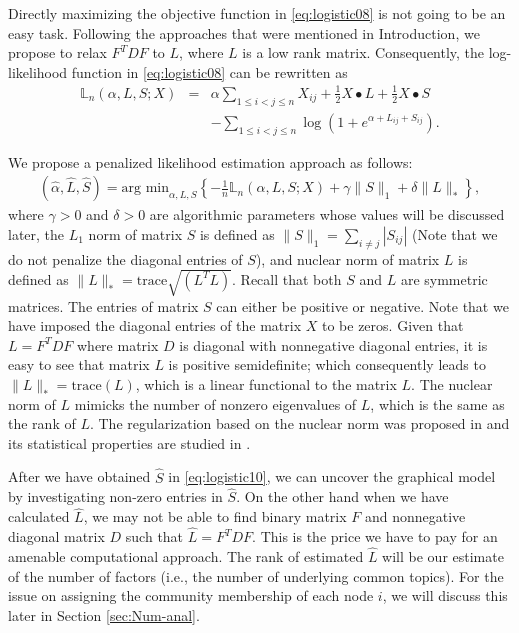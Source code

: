 \documentclass[AMS,STIX1COL]{WileyNJD-v2}
\begin{document}
{\begin{enumerate}
\end{enumerate}


Directly maximizing the objective function in \eqref{eq:logistic08} is not going to be an easy task.
Following the approaches that were mentioned in Introduction, we propose to relax $F^T D F$ to $L$, where $L$ is a low rank matrix.
Consequently, the log-likelihood function in \eqref{eq:logistic08} can be rewritten as
\begin{eqnarray}
\label{eq:logistic09}
\mathbb{L}_n(\alpha,  L, S; X)
&=& \alpha \sum_{1\le i< j\le n}X_{ij} +\frac{1}{2} X \bullet L +\frac{1}{2} X \bullet S \\
&& -\sum_{1\le i<j\le n} \log \left(1 + e^{\alpha + L_{ij} +S_{ij}}\right). \nonumber
\end{eqnarray}


We propose a penalized likelihood estimation approach as follows:
\begin{eqnarray}
\label{eq:logistic10}
(\hat{\alpha}, \widehat{L}, \widehat{S})
= \mbox{arg min}_{\alpha, L, S} \left\{
-\frac{1}{n} \mathbb{L}_n(\alpha,  L, S; X) + \gamma \|S\|_1
+ \delta \|L\|_\ast\right\},
\end{eqnarray}
where $\gamma>0$ and $\delta>0$ are algorithmic parameters whose values will be discussed later,
the $L_1$ norm of matrix $S$ is defined as $\|S\|_1 = \sum_{i\neq j} |S_{ij}|$ (Note that we do not penalize the diagonal entries of $S$), and nuclear norm of matrix $L$ is defined as $\|L\|_\ast = {\mbox{trace}\sqrt{(L^T L)}}$.
Recall that both $S$ and $L$ are symmetric matrices.
The entries of matrix $S$ can either be positive or negative.
Note that we have imposed the diagonal entries of the matrix $X$ to be zeros.
Given that $L = F^T D F$ where matrix $D$ is diagonal with nonnegative diagonal entries, it is easy to see that matrix $L$ is positive semidefinite; which consequently leads to $\|L\|_\ast = \mbox{trace}(L)$, which is a linear functional to the matrix $L$.
The nuclear norm of $L$ mimicks the number of nonzero eigenvalues of $L$, which is the same as the rank
of $L$.
The regularization based on the nuclear norm was proposed in \cite{fazel2001rank}
and its statistical properties are studied in \cite{bach2008consistency}.

After we have obtained $\widehat{S}$ in \eqref{eq:logistic10}, we can uncover the graphical model by investigating non-zero entries in $\widehat{S}$.
On the other hand when we have calculated $\widehat{L}$, we may not be able to find binary matrix $F$ and nonnegative diagonal matrix $D$ such that $\widehat{L} = F^T D F.$
This is the price we have to pay for an amenable computational approach.
The rank of estimated $\widehat{L}$ will be our estimate of the number of factors (i.e., the number of underlying common topics).
For the issue on assigning the community membership of each node $i$, we will discuss this later in Section \ref{sec:Num-anal}.

}
\end{document}
